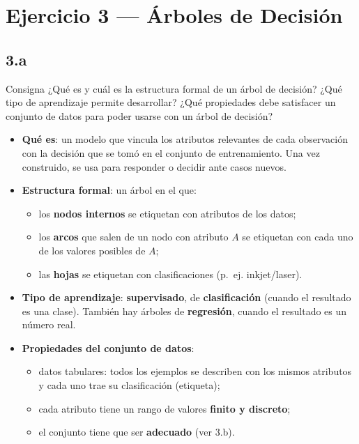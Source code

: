\documentclass[11pt,a4paper]{article}
\begin{document}
\section{Ejercicio 3 --- Árboles de Decisión}

\subsection{3.a}

\begin{enunciado}{Consigna}
¿Qué es y cuál es la estructura formal de un árbol de decisión? ¿Qué tipo de aprendizaje permite desarrollar? ¿Qué propiedades debe satisfacer un conjunto de datos para poder usarse con un árbol de decisión?
\end{enunciado}

\begin{itemize}
  \item \textbf{Qué es}: un modelo que vincula los atributos relevantes de cada observación con la decisión que se tomó en el conjunto de entrenamiento. Una vez construido, se usa para responder o decidir ante casos nuevos.
  \item \textbf{Estructura formal}: un árbol en el que:
  \begin{itemize}
    \item los \textbf{nodos internos} se etiquetan con atributos de los datos;
    \item los \textbf{arcos} que salen de un nodo con atributo $A$ se etiquetan con cada uno de los valores posibles de $A$;
    \item las \textbf{hojas} se etiquetan con clasificaciones (p.~ej. inkjet/laser).
  \end{itemize}
  \item \textbf{Tipo de aprendizaje}: \textbf{supervisado}, de \textbf{clasificación} (cuando el resultado es una clase). También hay árboles de \textbf{regresión}, cuando el resultado es un número real.
  \item \textbf{Propiedades del conjunto de datos}:
  \begin{itemize}
    \item datos tabulares: todos los ejemplos se describen con los mismos atributos y cada uno trae su clasificación (etiqueta);
    \item cada atributo tiene un rango de valores \textbf{finito y discreto};
    \item el conjunto tiene que ser \textbf{adecuado} (ver 3.b).
  \end{itemize}
\end{itemize}
\end{document}
